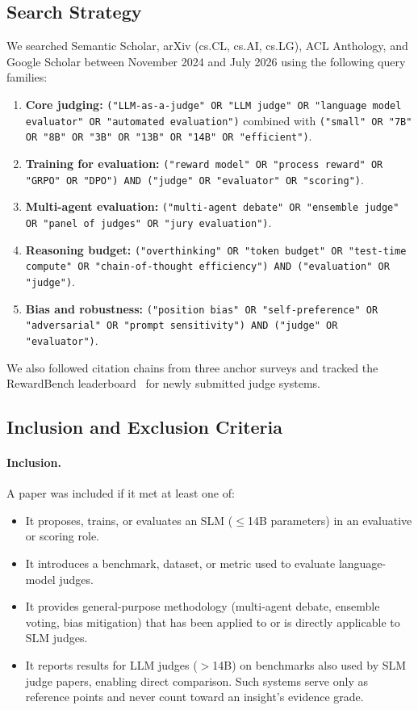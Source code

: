 \subsection{Search Strategy}

We searched Semantic Scholar, arXiv (cs.CL, cs.AI, cs.LG), ACL Anthology, and Google Scholar between November 2024 and July 2026 using the following query families:

\begin{enumerate}[leftmargin=1.5em, itemsep=2pt]
  \item \textbf{Core judging:} \texttt{("LLM-as-a-judge" OR "LLM judge" OR "language model evaluator" OR "automated evaluation")} combined with \texttt{("small" OR "7B" OR "8B" OR "3B" OR "13B" OR "14B" OR "efficient")}.
  \item \textbf{Training for evaluation:} \texttt{("reward model" OR "process reward" OR "GRPO" OR "DPO") AND ("judge" OR "evaluator" OR "scoring")}.
  \item \textbf{Multi-agent evaluation:} \texttt{("multi-agent debate" OR "ensemble judge" OR "panel of judges" OR "jury evaluation")}.
  \item \textbf{Reasoning budget:} \texttt{("overthinking" OR "token budget" OR "test-time compute" OR "chain-of-thought efficiency") AND ("evaluation" OR "judge")}.
  \item \textbf{Bias and robustness:} \texttt{("position bias" OR "self-preference" OR "adversarial" OR "prompt sensitivity") AND ("judge" OR "evaluator")}.
\end{enumerate}

We also followed citation chains from three anchor surveys \citep{gu2024survey, li2025generation, li2024llms} and tracked the RewardBench leaderboard~\citep{lambert2025rewardbench} for newly submitted judge systems.

\subsection{Inclusion and Exclusion Criteria}

\paragraph{Inclusion.} A paper was included if it met at least one of:
\begin{itemize}[leftmargin=1.2em, itemsep=2pt]
  \item It proposes, trains, or evaluates an SLM ($\leq$14B parameters) in an evaluative or scoring role.
  \item It introduces a benchmark, dataset, or metric used to evaluate language-model judges.
  \item It provides general-purpose methodology (multi-agent debate, ensemble voting, bias mitigation) that has been applied to or is directly applicable to SLM judges.
  \item It reports results for LLM judges ($>$14B) on benchmarks also used by SLM judge papers, enabling direct comparison. Such systems serve only as reference points and never count toward an insight's evidence grade.
\end{itemize}


